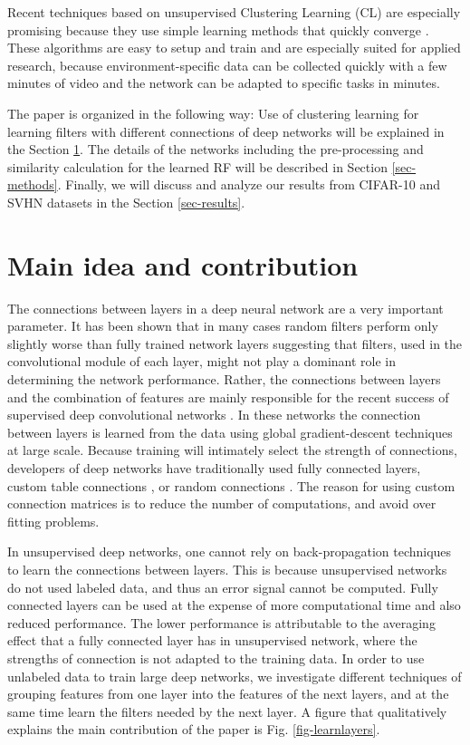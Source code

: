 \documentclass{article} %
\begin{document}
Recent techniques based on unsupervised Clustering Learning (CL) are especially promising because they use 
simple learning methods that quickly converge \cite{culurciello2013clustering,coates_analysis_2011}. These 
algorithms are easy to setup and train and are especially suited for applied research, because environment-specific data 
can be collected quickly with a few minutes of video and the network can be adapted to specific tasks in minutes.

The paper is organized in the following way: Use of clustering learning for learning filters with different connections of deep networks will be explained in the Section \ref{sec-main}. The details of the networks including the pre-processing and similarity calculation for the learned RF will be described in Section \ref{sec-methods}. Finally, we will discuss and analyze our results from CIFAR-10 and SVHN datasets in the Section \ref{sec-results}. 



\section{Main idea and contribution}
\label{sec-main}

The connections between layers in a deep neural network are a very important parameter. It has been shown that in 
many cases random filters perform only slightly worse than fully trained network layers \cite{saxe2011random} suggesting
 that filters, used in the convolutional module of each layer, might not play a dominant role in determining the network performance.
Rather, the connections between layers and the combination of features are mainly responsible for the recent success of 
supervised deep convolutional networks \cite{krizhevsky_imagenet_2012}. In these networks the connection between layers is
 learned from the data using global gradient-descent techniques at large scale. Because training will intimately select the strength of connections, 
 developers of deep networks have traditionally used fully connected layers, custom table connections \cite{lecun_gradient-based_1998}, or 
 random connections \cite{lecun_convolutional_2010}. The reason for using custom connection matrices 
 is to reduce the number of computations, and avoid over fitting problems.
 
In unsupervised deep networks, one cannot rely on back-propagation techniques to learn the connections between layers. 
This is because unsupervised networks do not used labeled data, and thus an error signal cannot be computed. 
Fully connected layers can be used \cite{culurciello2013clustering,coates_analysis_2011} at the expense of more computational time
 and also reduced performance. The lower performance is attributable to the averaging effect that a fully connected layer has in 
 unsupervised network, where the strengths of connection is not adapted to the training data. In order to use unlabeled data to train 
 large deep networks, we investigate different techniques of grouping features from one layer into the features of the next layers, 
 and at the same time learn the filters needed by the next layer. A figure that qualitatively explains the main contribution of the paper is Fig. \ref{fig-learnlayers}.
\end{document}
